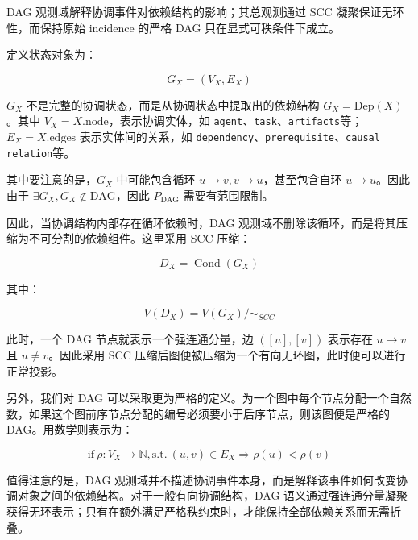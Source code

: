   DAG 观测域解释协调事件对依赖结构的影响；其总观测通过 SCC 凝聚保证无环性，而保持原始 incidence 的严格 DAG 只在显式可秩条件下成立。

  定义状态对象为：

  \begin{equation}
    \boxed{
      G_X=(V_X,E_X)
    }
    \label{eq:dag-source-dependency-graph}
  \end{equation}

  $G_X$ 不是完整的协调状态，而是从协调状态中提取出的依赖结构 $G_X=\text{Dep}(X)$。其中 $V_{X}=X.\text{node}$，表示协调实体，如 \texttt{agent}、\texttt{task}、\texttt{artifacts}等；$E_{X}=X.\text{edges}$ 表示实体间的关系，如 \texttt{dependency}、\texttt{prerequisite}、\texttt{causal relation}等。

  其中要注意的是，$G_X$ 中可能包含循环 $u \rightarrow v, v \rightarrow u$，甚至包含自环 $u \rightarrow u$。因此由于 $\exists G_X, G_X \notin \text{DAG}$，因此 $P_{\text{DAG}}$ 需要有范围限制。

  因此，当协调结构内部存在循环依赖时，DAG 观测域不删除该循环，而是将其压缩为不可分割的依赖组件。这里采用 SCC 压缩：

  \begin{equation}
    \boxed{
      D_X=\operatorname{Cond}(G_X)
    }
    \label{eq:dag-condensation}
  \end{equation}

  其中：

  \begin{equation}
    \boxed{
      V(D_X)
      =
      V(G_X)/\sim_{SCC}
    }
    \label{eq:dag-scc-quotient-vertices}
  \end{equation}

  此时，一个 DAG 节点就表示一个强连通分量，边 $([u],[v])$ 表示存在 $u \rightarrow v$ 且 $u \neq v$。因此采用 SCC 压缩后图便被压缩为一个有向无环图，此时便可以进行正常投影。

  另外，我们对 DAG 可以采取更为严格的定义。为一个图中每个节点分配一个自然数，如果这个图前序节点分配的编号必须要小于后序节点，则该图便是严格的 DAG。用数学则表示为：

  \begin{equation}
    \boxed{
      \text{if} \ \rho:V_X\rightarrow\mathbb N,\text{s.t.} \ (u,v)\in E_X \Rightarrow \rho(u)<\rho(v)
    }
    \label{eq:dag-strict-ranking-condition}
  \end{equation}

  值得注意的是，DAG 观测域并不描述协调事件本身，而是解释该事件如何改变协调对象之间的依赖结构。对于一般有向协调结构，DAG 语义通过强连通分量凝聚获得无环表示；只有在额外满足严格秩约束时，才能保持全部依赖关系而无需折叠。

